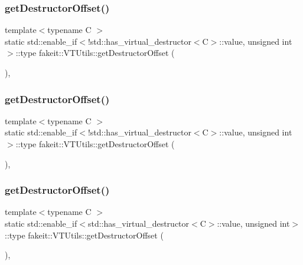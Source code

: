 \subsubsection{\texorpdfstring{getDestructorOffset()}{getDestructorOffset()}\hspace{0.1cm}{\footnotesize\ttfamily [7/18]}}
{\footnotesize\ttfamily template$<$typename C $>$ \\
static std\+::enable\+\_\+if$<$!std\+::has\+\_\+virtual\+\_\+destructor$<$C$>$\+::value, unsigned int$>$\+::type fakeit\+::\+V\+T\+Utils\+::get\+Destructor\+Offset (\begin{DoxyParamCaption}{ }\end{DoxyParamCaption})\hspace{0.3cm}{\ttfamily [inline]}, {\ttfamily [static]}}

\mbox{\label{classfakeit_1_1VTUtils_ac13eea89df8b1656a1bedb9a9bb5c518}} 
\subsubsection{\texorpdfstring{getDestructorOffset()}{getDestructorOffset()}\hspace{0.1cm}{\footnotesize\ttfamily [8/18]}}
{\footnotesize\ttfamily template$<$typename C $>$ \\
static std\+::enable\+\_\+if$<$!std\+::has\+\_\+virtual\+\_\+destructor$<$C$>$\+::value, unsigned int$>$\+::type fakeit\+::\+V\+T\+Utils\+::get\+Destructor\+Offset (\begin{DoxyParamCaption}{ }\end{DoxyParamCaption})\hspace{0.3cm}{\ttfamily [inline]}, {\ttfamily [static]}}

\mbox{\label{classfakeit_1_1VTUtils_a9c71030f6040b59ec03cbe326ae1d654}} 
\subsubsection{\texorpdfstring{getDestructorOffset()}{getDestructorOffset()}\hspace{0.1cm}{\footnotesize\ttfamily [9/18]}}
{\footnotesize\ttfamily template$<$typename C $>$ \\
static std\+::enable\+\_\+if$<$std\+::has\+\_\+virtual\+\_\+destructor$<$C$>$\+::value, unsigned int$>$\+::type fakeit\+::\+V\+T\+Utils\+::get\+Destructor\+Offset (\begin{DoxyParamCaption}{ }\end{DoxyParamCaption})\hspace{0.3cm}{\ttfamily [inline]}, {\ttfamily [static]}}


